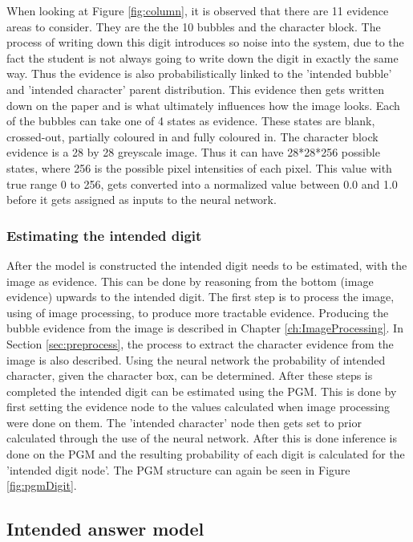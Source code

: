 When looking at Figure \ref{fig:column}, it is observed that there are 11 evidence areas to consider. They are the the 10 bubbles and the character block. The process of writing down this digit introduces so noise into the system, due to the fact the student is not always going to write down the digit in exactly the same way. Thus the evidence is also probabilistically linked to the 'intended bubble' and 'intended character' parent distribution. This evidence then gets written down on the paper and is what ultimately influences how the image looks. Each of the bubbles can take one of 4 states as evidence. These states are blank, crossed-out, partially coloured in and fully coloured in. The character block evidence is a 28 by 28 greyscale image. Thus it can have 28*28*256 possible states, where 256 is the possible pixel intensities of each pixel. This value with true range 0 to 256, gets converted into a normalized value between 0.0 and 1.0 before it gets assigned as inputs to the neural network.


\subsubsection{Estimating the intended digit}
\label{sec:intendedDigit}
After the model is constructed the intended digit needs to be estimated, with the image as evidence. This can be done by reasoning from the bottom (image evidence) upwards to the intended digit. The first step is to process the image, using of image processing, to produce more tractable evidence. Producing the bubble evidence from the image is described in Chapter \ref{ch:ImageProcessing}. In Section \ref{sec:preprocess}, the process to extract the character evidence from the image is also described. Using the neural network the probability of intended character, given the character box, can be determined. After these steps is completed the intended digit can be estimated using the PGM. This is done by first setting the evidence node to the values calculated when image processing were done on them. The 'intended character' node then gets set to prior calculated through the use of the neural network. After this is done inference is done on the PGM and the resulting probability of each digit is calculated for the 'intended digit node'. The PGM structure can again be seen in Figure \ref{fig:pgmDigit}. 


\subsection{Intended answer model}
\label{sec:pgmStudentNum}

